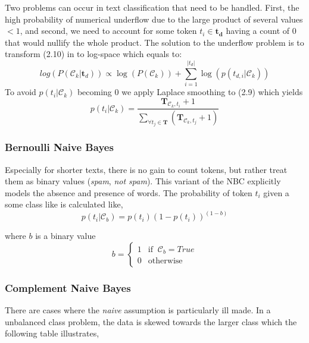Two problems can occur in text classification that need to be handled. First, the high probability of numerical underflow due to the large product of several values $<1$, and second, we need to account for some token $t_i \in \boldsymbol{t_d}$ having a count of $0$ that would nullify the whole product. The solution to the underflow problem is to transform (2.10) in to log-space which equals to:
%
\[log(P(\mathcal{C}_k|\boldsymbol{t}_d)) \propto \log(P(\mathcal{C}_k)) + \sum_{i=1}^{|t_{d}|} \log({p(t_{d,i}|\mathcal{C}_k)}) \]
%
To avoid $p({t_{i}}|\mathcal{C}_k)$ becoming $0$ we apply Laplace smoothing to (2.9) which yields
\[p({t_{i}}|\mathcal{C}_k) = \frac{\boldsymbol{T}_{\mathcal{C}_k,t_{i}} + 1}{\sum_{\forall t_j \in \boldsymbol{T}}(\boldsymbol{T}_{\mathcal{C}_k,t_j} + 1)}\]

\subsubsection{Bernoulli Naive Bayes}
Especially for shorter texts, there is no gain to count tokens, but rather treat them as binary values (\emph{spam}, \emph{not spam}). This variant of the NBC explicitly models the absence and presence of words. The probability of token $t_i$ given a some class like is calculated like,
\[p(t_{i}|\mathcal{C}_b) = p(t_{i})(1-p(t_{i}))^{(1-b)}\]

where $b$ is a binary value
\[
  b = \begin{cases}1 & \text{if }\ \mathcal{C}_b = True\\
  0 & \text{otherwise}\end{cases}
  \]

\subsubsection{Complement Naive Bayes}
There are cases where the \textsl{naive} assumption is particularly ill made. In a unbalanced class problem, the data is skewed towards the larger class which the following table illustrates,

